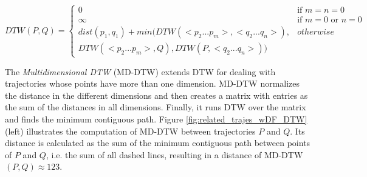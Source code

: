 \documentclass[12pt]{article}
\begin{document}
\begin{equation}
\label{func:DTW}
  DTW(P, Q) = 
  \begin{cases} 
      0 & \text{if } m = n = 0\\ 
      \infty & \text{if } m = 0 \text{ or } n = 0\\ 
      dist(p_1, q_1) + min(DTW(<p_2...p_m>,<q_2...q_n>), & otherwise\\
      DTW(<p_2...p_m>, Q), DTW(P, <q_2...q_n>)) &
  \end{cases}
\end{equation}

The \emph{Multidimensional DTW} (MD-DTW) \cite{ten2007multi} extends DTW for dealing with trajectories whose points have more than one dimension. MD-DTW normalizes the distance in the different dimensions and then creates a matrix with entries as the sum of the distances in all dimensions. Finally, it runs DTW over the matrix and finds the minimum contiguous path. Figure \ref{fig:related_trajes_wDF_DTW} (left) illustrates the computation of MD-DTW between trajectories $P$ and $Q$. Its distance is calculated as the sum of the minimum contiguous path between points of $P$ and $Q$, i.e. the sum of all dashed lines, resulting in a distance of MD-DTW$(P, Q) \approx 123$.

\end{document}
